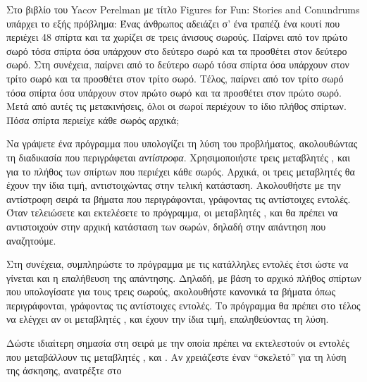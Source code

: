 \documentclass[a4paper,11pt,oneside]{book}
\begin{document}
\begin{exercise}
Στο βιβλίο του Yacov Perelman με τίτλο Figures for Fun: Stories and Conundrums υπάρχει το εξής πρόβλημα: Ένας άνθρωπος αδειάζει σ' ένα τραπέζι ένα κουτί που περιέχει 48 σπίρτα και τα χωρίζει σε τρεις άνισους σωρούς. Παίρνει από τον πρώτο σωρό τόσα σπίρτα όσα υπάρχουν στο δεύτερο σωρό και τα προσθέτει στον δεύτερο σωρό. Στη συνέχεια, παίρνει από το δεύτερο σωρό τόσα σπίρτα όσα υπάρχουν στον τρίτο σωρό και τα προσθέτει στον τρίτο σωρό. Τέλος, παίρνει από τον τρίτο σωρό τόσα σπίρτα όσα υπάρχουν στον πρώτο σωρό και τα προσθέτει στον πρώτο σωρό. Μετά από αυτές τις μετακινήσεις, όλοι οι σωροί περιέχουν το ίδιο πλήθος σπίρτων. Πόσα σπίρτα περιείχε κάθε σωρός αρχικά;

Να γράψετε ένα πρόγραμμα που υπολογίζει τη λύση του προβλήματος, ακολουθώντας τη διαδικασία που περιγράφεται \emph{αντίστροφα}.
Χρησιμοποιήστε τρεις μεταβλητές ,  και  για το πλήθος των σπίρτων που περιέχει κάθε σωρός. Αρχικά, οι τρεις μεταβλητές θα έχουν την ίδια τιμή, αντιστοιχώντας στην τελική κατάσταση. Ακολουθήστε με την αντίστροφη σειρά τα βήματα που περιγράφονται, γράφοντας τις αντίστοιχες εντολές. Όταν τελειώσετε και εκτελέσετε το πρόγραμμα, οι μεταβλητές ,  και  θα πρέπει να αντιστοιχούν στην αρχική κατάσταση των σωρών, δηλαδή στην απάντηση που αναζητούμε.

Στη συνέχεια, συμπληρώστε το πρόγραμμα με τις κατάλληλες εντολές έτσι ώστε να γίνεται και η επαλήθευση της απάντησης. Δηλαδή, με βάση το αρχικό πλήθος σπίρτων που υπολογίσατε για τους τρεις σωρούς, ακολουθήστε κανονικά τα βήματα όπως περιγράφονται, γράφοντας τις αντίστοιχες εντολές. Το πρόγραμμα θα πρέπει στο τέλος να ελέγχει αν οι μεταβλητές ,  και  έχουν την ίδια τιμή, επαληθεύοντας τη λύση.


\begin{note}
Δώστε ιδιαίτερη σημασία στη σειρά με την οποία πρέπει να εκτελεστούν οι εντολές που μεταβάλλουν τις μεταβλητές ,  και . Αν χρειάζεστε έναν ``σκελετό'' για τη λύση της άσκησης, ανατρέξτε στο 
\end{note}
\end{exercise}

\end{document}
